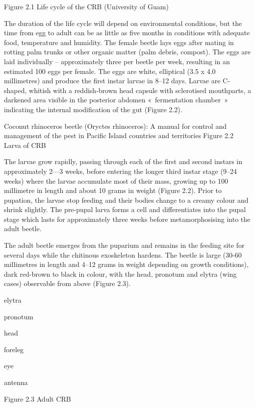 \documentclass[twocolumn,letterpaper]{scrartcl}
\begin{document}
Figure 2.1  Life cycle of the CRB (University of Guam)

The duration of the life cycle will depend on environmental conditions, but the time from egg to adult can 
be as little as five months in conditions with adequate food, temperature and humidity. The female beetle 
lays eggs after mating in rotting palm trunks or other organic matter (palm debris, compost). The eggs are 
laid individually – approximately three per beetle per week, resulting in an estimated 100 eggs per female. 
The eggs are white, elliptical (3.5 x 4.0 millimetres) and produce the first instar larvae in 8–12 days. Larvae are 
C-shaped, whitish with a reddish-brown head capsule with sclerotised mouthparts, a darkened area visible in 
the posterior abdomen « fermentation chamber » indicating the internal modification of the gut (Figure 2.2). 

Coconut rhinoceros beetle (Oryctes rhinoceros): A manual for control and management of the pest in Pacific Island countries and territoriesFigure 2.2 Larva of CRB 

The larvae grow rapidly, passing through each of the first and second instars in approximately 2—3 weeks, 
before entering the longer third instar stage (9–24 weeks) where the larvae accumulate most of their mass, 
growing up to 100 millimetre in length and about 10 grams in weight (Figure 2.2). Prior to pupation, the larvae 
stop feeding and their bodies change to a creamy colour and shrink slightly. The pre-pupal larva forms a cell 
and differentiates into the pupal stage which lasts for approximately three weeks before metamorphosising 
into the adult beetle. 

The adult beetle emerges from the puparium and remains in the feeding site for several days while the chitinous 
exoskeleton hardens. The beetle is large (30-60 millimetres in length and 4–12 grams in weight depending 
on growth conditions), dark red-brown to black in colour, with the head, pronotum and elytra (wing cases) 
observable from above (Figure 2.3). 

elytra

pronotum

head

foreleg

eye

antenna

Figure 2.3 Adult CRB
\end{document}
